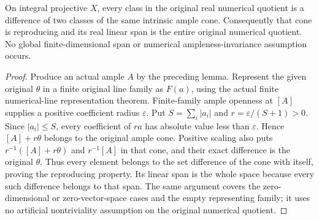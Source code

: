 \begin{theorem}
\label{thm:native-numerical-ample-cone-generation}
\leanok
{}
On integral projective $X$, every class in the original real numerical
quotient is a difference of two classes of the same intrinsic ample
cone. Consequently that cone is reproducing and its real linear span
is the entire original numerical quotient. No global finite-dimensional
span or numerical ampleness-invariance assumption occurs.
\end{theorem}
\begin{proof}
Produce an actual ample $A$ by the preceding lemma. Represent the given
original $\theta$ in a finite original line family as $F(a)$, using the
actual finite numerical-line representation theorem. Finite-family
ample openness at $[A]$ supplies a positive coefficient radius
$\varepsilon$. Put $S=\sum_i|a_i|$ and
$r=\varepsilon/(S+1)>0$. Since $|a_i|\leq S$, every coefficient of
$ra$ has absolute value less than $\varepsilon$. Hence
$[A]+r\theta$ belongs to the original ample cone. Positive scaling
also puts $r^{-1}([A]+r\theta)$ and $r^{-1}[A]$ in that cone, and their
exact difference is the original $\theta$.
Thus every element belongs to the set difference of the cone with
itself, proving the reproducing property. Its linear span is the whole
space because every such difference belongs to that span. The same
argument covers the zero-dimensional or zero-vector-space cases and
the empty representing family; it uses no artificial nontriviality
assumption on the original numerical quotient.
\end{proof}
